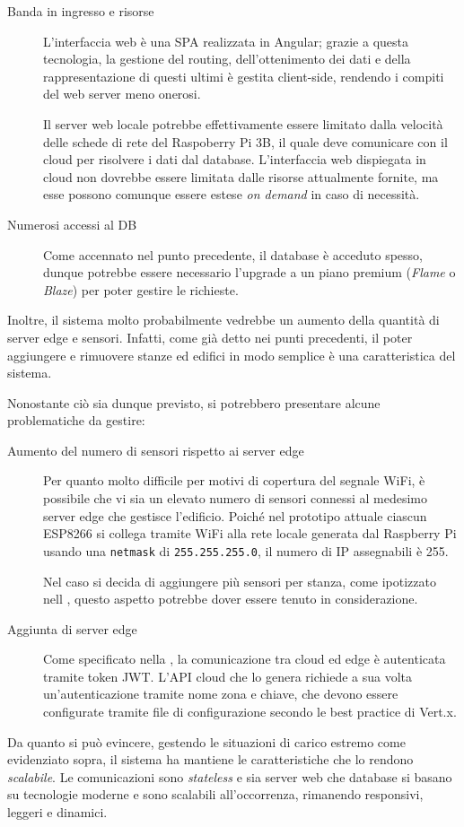 \begin{description}
  \item[Banda in ingresso e risorse]
    L'interfaccia web è una SPA realizzata in Angular;
    grazie a questa tecnologia, la gestione del routing, dell'ottenimento dei dati e della rappresentazione di questi ultimi è gestita client-side,
    rendendo i compiti del web server meno onerosi.

    Il server web locale potrebbe effettivamente essere limitato dalla velocità delle schede di rete del Raspoberry Pi 3B,
    il quale deve comunicare con il cloud per risolvere i dati dal database.
    L'interfaccia web dispiegata in cloud non dovrebbe essere limitata dalle risorse attualmente fornite, ma esse possono comunque essere estese \emph{on demand} in caso di necessità.

  \item[Numerosi accessi al DB]
    Come accennato nel punto precedente, il database è acceduto spesso, dunque potrebbe essere necessario l'upgrade a un piano premium (\emph{Flame} o \emph{Blaze}) per poter gestire le richieste.
\end{description}

Inoltre, il sistema molto probabilmente vedrebbe un aumento della quantità di server edge e sensori.
Infatti, come già detto nei punti precedenti, il poter aggiungere e rimuovere stanze ed edifici in modo semplice è una caratteristica del sistema.

Nonostante ciò sia dunque previsto, si potrebbero presentare alcune problematiche da gestire:
\begin{description}
  \item[Aumento del numero di sensori rispetto ai server edge]
    Per quanto molto difficile per motivi di copertura del segnale WiFi, è possibile che vi sia un elevato numero di sensori connessi al medesimo server edge che gestisce l'edificio.
    Poiché nel prototipo attuale ciascun ESP8266 si collega tramite WiFi alla rete locale generata dal Raspberry Pi usando una \texttt{netmask} di \texttt{255.255.255.0}, il numero di IP assegnabili è 255.

    Nel caso si decida di aggiungere più sensori per stanza, come ipotizzato nell , questo aspetto potrebbe dover essere tenuto in considerazione.
  \item[Aggiunta di server edge]
    Come specificato nella , la comunicazione tra cloud ed edge è autenticata tramite token JWT\@.
    L'API cloud che lo genera richiede a sua volta un'autenticazione tramite nome zona e chiave, che devono essere configurate tramite file di configurazione secondo le best practice di Vert.x.
\end{description}

Da quanto si può evincere, gestendo le situazioni di carico estremo come evidenziato sopra, il sistema ha mantiene le caratteristiche che lo rendono \emph{scalabile}.
Le comunicazioni sono \emph{stateless} e sia server web che database si basano su tecnologie moderne e sono scalabili all'occorrenza, rimanendo responsivi, leggeri e dinamici.
